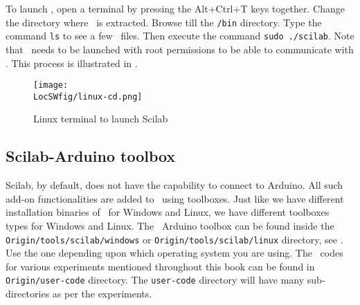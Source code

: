 To launch \scilab, open a terminal by pressing the Alt+Ctrl+T keys
together. Change the directory where \scilab\ is extracted. Browse
till the {\tt /bin} directory. Type the command {\tt ls} to see a few
\scilab\ files.  Then execute the command {\tt sudo ./scilab}. Note
that \scilab\ needs to be launched with root permissions to be able to
communicate with \arduino. This process is illustrated in
.
\begin{figure}
      \centering
      \texttt{[image: \\LocSWfig/linux-cd.png]}
      \caption{Linux terminal to launch Scilab}
      \label{linux-cd}
\end{figure}

\subsection{Scilab-Arduino toolbox}
\label{sec:sci-ard-toolbox}
Scilab, by default, does not have the capability to connect to
Arduino. All such add-on functionalities are added to \scilab\ using
toolboxes. Just like we have different installation binaries of
\scilab\ for Windows and Linux, we have different toolboxes types for
Windows and Linux. The \scilab\ Arduino toolbox can be found inside
the {\tt Origin/tools/scilab/windows} or {\tt Origin/tools/scilab/linux} directory,
see .  Use the one depending upon
which operating system you are using. The \scilab\ codes for various
experiments mentioned throughout this book can be found in {\tt
            Origin/user-code} directory. The {\tt user-code} directory will have
many sub-directories as per the experiments.

